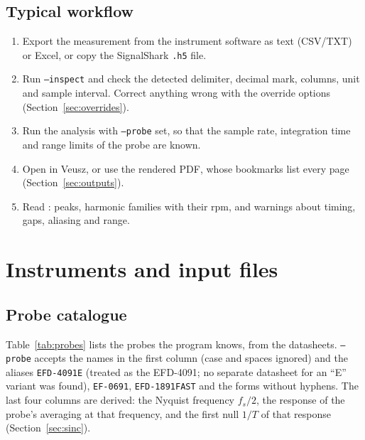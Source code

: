\documentclass[10pt,letterpaper]{article}
\numberwithin{equation}{section}
\begin{document}
\subsection{Typical workflow}
\begin{enumerate}
\item Export the measurement from the instrument software as text (CSV/TXT) or
Excel, or copy the SignalShark \texttt{.h5} file.
\item Run \texttt{--inspect} and check the detected delimiter, decimal mark,
columns, unit and sample interval. Correct anything wrong with the override
options (Section~\ref{sec:overrides}).
\item Run the analysis with \texttt{--probe} set, so that the sample rate,
integration time and range limits of the probe are known.
\item Open  in Veusz, or use the rendered PDF,
whose bookmarks list every page (Section~\ref{sec:outputs}).
\item Read : peaks, harmonic families with their rpm,
and warnings about timing, gaps, aliasing and range.
\end{enumerate}

\section{Instruments and input files}\label{sec:inputs}

\subsection{Probe catalogue}
Table~\ref{tab:probes} lists the probes the program knows, from the
datasheets. \texttt{--probe} accepts the names in the first column (case and
spaces ignored) and the aliases \texttt{EFD-4091E} (treated as the EFD-4091;
no separate datasheet for an ``E'' variant was found), \texttt{EF-0691},
\texttt{EFD-1891FAST} and the forms without hyphens. The last four columns are
derived: the Nyquist frequency $f_s/2$, the response of the probe's averaging at
that frequency, and the first null $1/T$ of that response
(Section~\ref{sec:sinc}).
\end{document}
